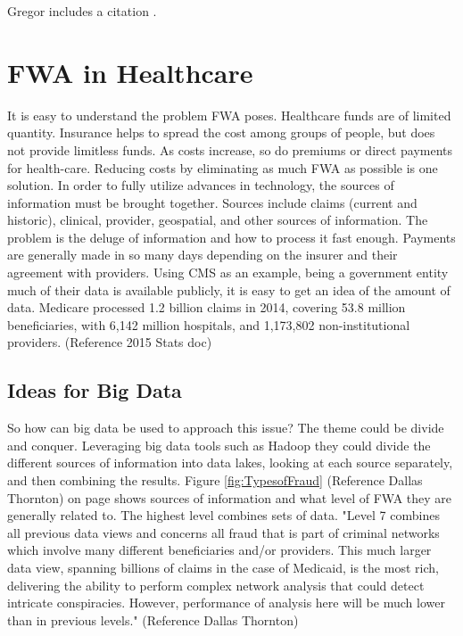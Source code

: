 \documentclass[sigconf]{acmart}
\begin{document}
Gregor includes a citation \cite{Waste}.

\section{FWA in Healthcare}

It is easy to understand the problem FWA poses.  Healthcare funds are of limited quantity.  Insurance helps to spread the cost among groups of people, but does not provide limitless funds.  As costs increase, so do premiums or direct payments for health-care.  Reducing costs by eliminating as much FWA as possible is one solution.
In order to fully utilize advances in technology, the sources of information must be brought together.  Sources include claims (current and historic), clinical, provider, geospatial, and other sources of information.  The problem is the deluge of information and how to process it fast enough.  Payments are generally made in so many days depending on the insurer and their agreement with providers.  Using CMS as an example, being a government entity much of their data is available publicly, it is easy to get an idea of the amount of data.  Medicare processed 1.2 billion claims in 2014, covering 53.8 million beneficiaries, with 6,142 million hospitals, and 1,173,802 non-institutional providers.  (Reference 2015 Stats doc)


\subsection{Ideas for Big Data}

So how can big data be used to approach this issue?  The theme could be divide and conquer.  Leveraging big data tools such as Hadoop they could divide the different sources of information into data lakes, looking at each source separately, and then combining the results.  Figure \ref{fig:TypesofFraud} (Reference Dallas Thornton) on page \pageref{fig:TypesofFraud} shows sources of information and what level of FWA they are generally related to.  The highest level combines sets of data.  "Level 7 combines all previous data views and concerns all fraud that is part of criminal networks which involve many different beneficiaries and/or providers. This much larger data view, spanning billions of claims in the case of Medicaid, is the most rich, delivering the ability to perform complex network analysis that could detect intricate conspiracies. However, performance of analysis here will be much lower than in previous levels."  (Reference Dallas Thornton) 
\end{document}
